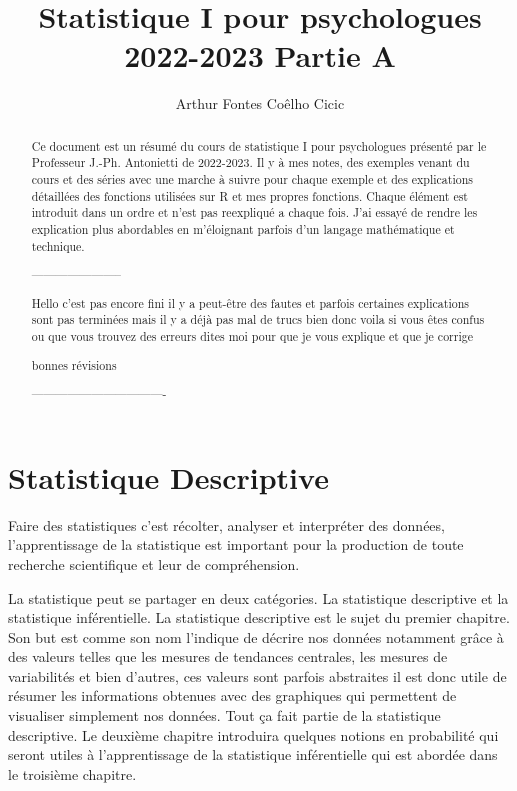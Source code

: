 \documentclass{report}
\title{Statistique I pour psychologues 2022-2023 Partie A}
\author{Arthur Fontes Coêlho Cicic}
\begin{document}
\maketitle

\begin{abstract}
Ce document est un résumé du cours de statistique I pour psychologues présenté par le Professeur J.-Ph. Antonietti de 2022-2023. Il y à mes notes, des exemples venant du cours et des séries avec une marche à suivre pour chaque exemple et des explications détaillées des fonctions utilisées sur R et mes propres fonctions. Chaque élément est introduit dans un ordre et n'est pas reexpliqué a chaque fois. J'ai essayé de rendre les explication plus abordables en m'éloignant parfois d'un langage mathématique et technique.

----------------------- 

Hello c'est pas encore fini il y a peut-être des fautes et parfois certaines explications sont pas terminées mais il y a déjà pas mal de trucs bien donc voila si vous êtes confus ou que vous trouvez des erreurs dites moi pour que je vous explique et que je corrige 

bonnes révisions 

----------------------------------

\end{abstract}

\tableofcontents

\chapter{Statistique Descriptive}
Faire des statistiques c'est récolter, analyser et interpréter des données, l'apprentissage de la statistique est important pour la production de toute recherche scientifique et leur de compréhension. 

La statistique peut se partager en deux catégories. La statistique descriptive et la statistique inférentielle. La statistique descriptive est le sujet du premier chapitre. Son but est comme son nom l'indique de décrire nos données notamment grâce à des valeurs telles que les mesures de tendances centrales, les mesures de variabilités et bien d'autres, ces valeurs sont parfois abstraites il est donc utile de résumer les informations obtenues avec des graphiques qui permettent de visualiser simplement nos données. Tout ça fait partie de la statistique descriptive. Le deuxième chapitre introduira quelques notions en probabilité qui seront utiles à l'apprentissage de la statistique inférentielle qui est abordée dans le troisième chapitre.
\end{document}

